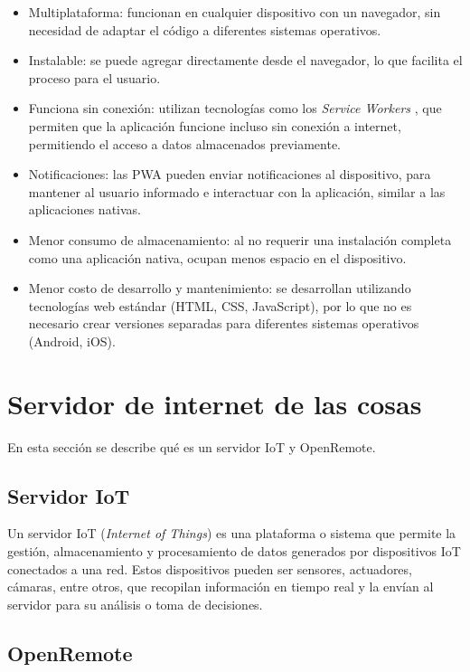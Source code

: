 \begin{itemize}
	\item Multiplataforma: funcionan en cualquier dispositivo con un navegador, sin necesidad de adaptar el código a diferentes sistemas operativos.
	\item Instalable: se puede agregar directamente desde el navegador, lo que facilita el proceso para el usuario.
	\item Funciona sin conexión: utilizan tecnologías como los \textit{Service Workers} \citep{serviceworker}, que permiten que la aplicación funcione incluso sin conexión a internet, permitiendo el acceso a datos almacenados previamente.
	\item Notificaciones: las PWA pueden enviar notificaciones al dispositivo, para mantener al usuario informado e interactuar con la aplicación, similar a las aplicaciones nativas.
	\item Menor consumo de almacenamiento: al no requerir una instalación completa como una aplicación nativa, ocupan menos espacio en el dispositivo.
	\item Menor costo de desarrollo y mantenimiento: se desarrollan utilizando tecnologías web estándar (HTML, CSS, JavaScript), por lo que no es necesario crear versiones separadas para diferentes sistemas operativos (Android, iOS).
\end{itemize}


\section{Servidor de internet de las cosas}

En esta sección se describe qué es un servidor IoT y OpenRemote.

\subsection{Servidor IoT}
Un servidor IoT (\textit{Internet of Things}) es una plataforma o sistema que permite la gestión, almacenamiento y procesamiento de datos generados por dispositivos IoT conectados a una red. Estos dispositivos pueden ser sensores, actuadores, cámaras, entre otros, que recopilan información en tiempo real y la envían al servidor para su análisis o toma de decisiones.

\subsection{OpenRemote}

